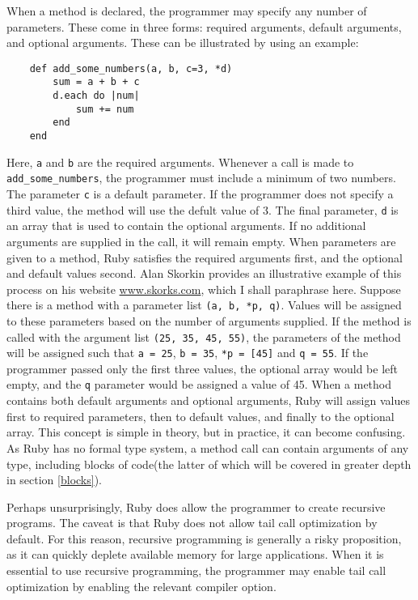 \documentclass[12pt]{article}
\begin{document}
When a method is declared, the programmer may specify any number of parameters. These come in three forms: required arguments, default arguments, and optional arguments. These can be illustrated by using an example:
\begin{lstlisting}
    def add_some_numbers(a, b, c=3, *d)
        sum = a + b + c
        d.each do |num|
            sum += num
        end
    end
\end{lstlisting}
Here, \verb|a| and \verb|b| are the required arguments. Whenever a call is made to \verb|add_some_numbers|, the programmer must include a minimum of two numbers. The parameter \verb|c| is a default parameter. If the programmer does not specify a third value, the method will use the defult value of 3. The final parameter, \verb|d| is an array that is used to contain the optional arguments. If no additional arguments are supplied in the call, it will remain empty\cite{skorkin}.
When parameters are given to a method, Ruby satisfies the required arguments first, and the optional and default values second. Alan Skorkin provides an illustrative example of this process on his website \url{www.skorks.com}, which I shall paraphrase here. Suppose there is a method with a parameter list \verb|(a, b, *p, q)|. Values will be assigned to these parameters based on the number of arguments supplied. If the method is called with the argument list \verb|(25, 35, 45, 55)|, the parameters of the method will be assigned such that \verb|a = 25|, \verb|b = 35|, \verb|*p = [45]| and \verb|q = 55|\cite{skorkin}. If the programmer passed only the first three values, the optional array would be left empty, and the \verb|q| parameter would be assigned a value of 45. When a method contains both default arguments and optional arguments, Ruby will assign values first to required parameters, then to default values, and finally to the optional array. This concept is simple in theory, but in practice, it can become confusing\cite{skorkin}.
As Ruby has no formal type system, a method call can contain arguments of any type, including blocks of code(the latter of which will be covered in greater depth in section \ref{blocks}).

Perhaps unsurprisingly, Ruby does allow the programmer to create recursive programs. The caveat is that Ruby does not allow tail call optimization by default. For this reason, recursive programming is generally a risky proposition, as it can quickly deplete available memory for large applications. When it is essential to use recursive programming, the programmer may enable tail call optimization by enabling the relevant compiler option\cite{bekal}.
\end{document}
